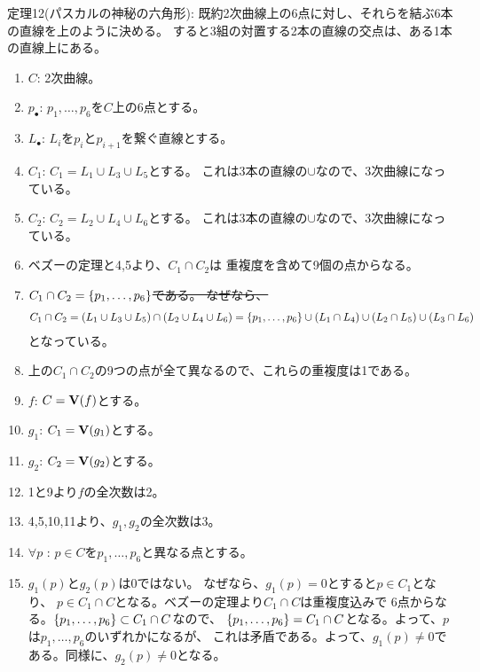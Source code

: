 \begin{framed}
  定理12(パスカルの神秘の六角形):
  既約2次曲線上の6点に対し、それらを結ぶ6本の直線を上のように決める。
  すると3組の対置する2本の直線の交点は、ある1本の直線上にある。
\end{framed}
\begin{myproof}
  \begin{enumerate}
    \item $C$: 2次曲線。
    \item $p_\bullet$: $p_1,\dots,p_6$を$C$上の6点とする。
    \item $L_\bullet$: $L_i$を$p_i$と$p_{i+1}$を繋ぐ直線とする。
    \item $C_1$: $C_1 = L_1 \cup L_3 \cup L_5$とする。
    これは3本の直線の$\cup$なので、3次曲線になっている。
    \item $C_2$: $C_2 = L_2 \cup L_4 \cup L_6$とする。
    これは3本の直線の$\cup$なので、3次曲線になっている。
    \item
    ベズーの定理と4,5より、$C_1 \cap C_2$は
    重複度を含めて9個の点からなる。
    \item
    \sout{$C_1 \cap C_2 = \left\{p_1,\dots,p_6\right\}$である。
    なぜなら、}
    \begin{align}
      C_1 \cap C_2
      =
      (L_1 \cup L_3 \cup L_5)\cap (L_2 \cup L_4 \cup L_6)
      =
      \left\{p_1,\dots,p_6\right\} \cup (L_1\cap L_4)\cup  (L_2 \cap L_5) \cup (L_3 \cap L_6)
    \end{align}
    となっている。
    \item
    上の$C_1\cap C_2$の9つの点が全て異なるので、これらの重複度は1である。
    \item
    $f$: $C=\textbf V(f)$とする。
    \item
    $g_1$: $C_1 = \textbf V(g_1)$とする。
    \item
    $g_2$: $C_2 = \textbf V(g_2)$とする。
    \item
    1と9より$f$の全次数は2。
    \item
    4,5,10,11より、$g_1,g_2$の全次数は3。
    \item
    $\forall p$ : $p\in C$を$p_1,\dots,p_6$と異なる点とする。
    \item
    $g_1(p)$と$g_2(p)$は0ではない。
    なぜなら、$g_1(p)=0$とすると$p\in C_1$となり、
    $p\in C_1 \cap C$となる。ベズーの定理より$C_1 \cap C$は重複度込みで
    6点からなる。$\left\{p_1,\dots,p_6\right\}\subset C_1 \cap C$なので、
    $\left\{p_1,\dots,p_6\right\} = C_1 \cap C$となる。よって、$p$は$p_1,\dots,p_6$のいずれかになるが、
    これは矛盾である。よって、$g_1(p) \neq 0$である。同様に、$g_2(p) \neq 0$となる。

\end{enumerate}
\end{myproof}
